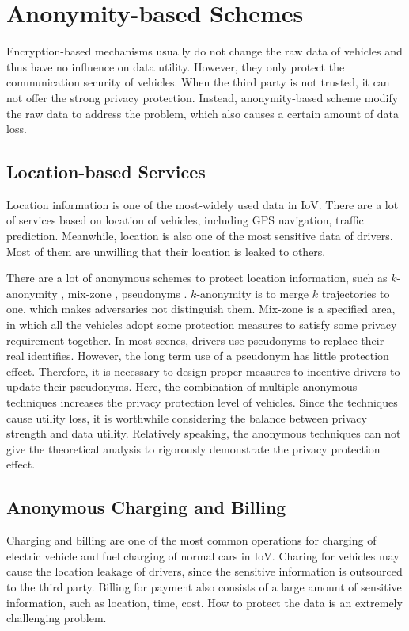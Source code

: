 \documentclass[journal,transmag,11pt]{IEEEtran}
\begin{document}
\section{Anonymity-based Schemes}

Encryption-based mechanisms usually do not change the raw data of vehicles and thus have no influence on data utility. However, they only protect the communication security of vehicles. When the third party is not trusted, it can not offer the strong privacy protection. Instead, anonymity-based scheme modify the raw data to address the problem, which also causes a certain amount of data loss.

\subsection{Location-based Services}

Location information is one of the most-widely used data in IoV. There are a lot of services based on location of vehicles, including GPS navigation, traffic prediction. Meanwhile, location is also one of the most sensitive data of drivers. Most of them are unwilling that their location is leaked to others.

There are a lot of anonymous schemes to protect location information, such as $k$-anonymity \cite{conf/icc/WuLYD17}, mix-zone \cite{journals/tvt/YingMH15}, pseudonyms \cite{journals/comsur/ContiWC13}. $k$-anonymity is to merge $k$ trajectories to one, which makes adversaries not distinguish them. Mix-zone is a specified area, in which all the vehicles adopt some protection measures to satisfy some privacy requirement together. In most scenes, drivers use pseudonyms to replace their real identifies. However, the long term use of a pseudonym has little protection effect. Therefore, it is necessary to design proper measures to incentive drivers to update their pseudonyms. Here, the combination of multiple anonymous techniques increases the privacy protection level of vehicles. Since the techniques cause utility loss, it is worthwhile considering the balance between privacy strength and data utility. Relatively speaking, the anonymous techniques can not give the theoretical analysis to rigorously demonstrate the privacy protection effect.  

\subsection{Anonymous Charging and Billing}

Charging and billing are one of the most common operations for charging of electric vehicle and fuel charging of normal cars in IoV. Charing for vehicles may cause the location leakage of drivers, since the sensitive information is outsourced to the third party. Billing for payment also consists of a large amount of sensitive information, such as location, time, cost. How to protect the data is an extremely challenging problem.
\end{document}
